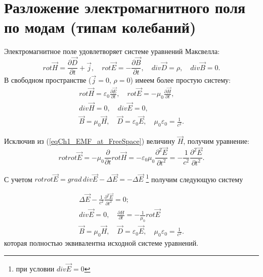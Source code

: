\section{Разложение электромагнитного поля по модам (типам колебаний)}
Электромагнитное поле удовлетворяет системе уравнений Максвелла:
\begin{equation}
rot \vec{H} = \frac{\partial \vec{D}}{\partial t} + \vec{j}, 
\quad
rot \vec{E} = - \frac{\partial \vec{B}}{\partial t}, 
\quad
div \vec{D} = \rho, \quad
div \vec{B} = 0.
\end{equation}
В свободном пространстве  ($\vec{j} = 0$, $\rho = 0$)  имеем более
простую систему: 
\begin{eqnarray}
rot \vec{H} = \varepsilon_0 \frac{\partial \vec{E}}{\partial t}, 
\quad
rot \vec{E} = - \mu_0 \frac{\partial \vec{H}}{\partial t}, 
\nonumber \\
div \vec{H} = 0,
\quad
div \vec{E} = 0, 
\nonumber \\
\vec{B} = \mu_0 \vec{H}, 
\quad 
\vec{D} = \varepsilon_0 \vec{E}, 
\quad
\mu_0 \varepsilon_0 = \frac{1}{c^2}.
\label{eqCh1_EMF_at_FreeSpace}
\end{eqnarray}

Исключив из (\ref{eqCh1_EMF_at_FreeSpace}) величину $\vec{H}$,  получим
уравнение:
\begin{equation}
rot rot \vec{E} = - \mu_0 \frac{\partial}{\partial t} rot \vec{H} = -
\varepsilon_0 \mu_0 \frac{\partial^2 \vec{E}}{\partial t^2} = 
- \frac{1}{c^2} \frac{\partial^2 \vec{E}}{\partial t^2}.
\nonumber
\end{equation}

С учетом $rot rot \vec{E} = grad \, div \vec{E} - \Delta \vec{E} = - \Delta
\vec{E}$ \footnote{при условии $div \vec E = 0$} получим следующую систему

\begin{eqnarray}
\Delta \vec{E} - \frac{1}{c^2} \frac{\partial^2 \vec{E}}{\partial t^2}
= 0;
\nonumber \\
div \vec{E} = 0, 
\quad
\frac{\partial H}{\partial t} = - \frac{1}{\mu_0} rot \vec{E}
\nonumber \\
\vec{B} = \mu_0 \vec{H}, \quad \vec{D} = \varepsilon_0 \vec{E}, \quad \mu_0
\varepsilon_0 = \frac{1}{c^2}.
\label{eqCh1_EMF_at_FreeSpace2}
\end{eqnarray}
которая полностью эквивалентна исходной системе уравнений. 

